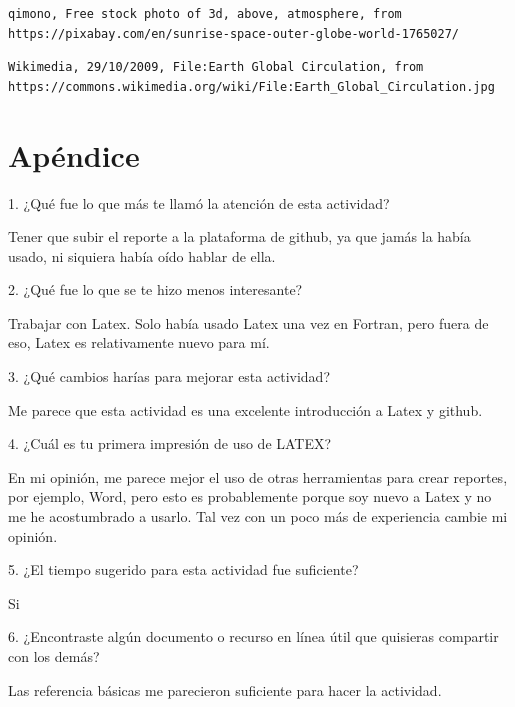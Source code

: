 \documentclass{article}
\begin{document}
\begin{verbatim}
qimono, Free stock photo of 3d, above, atmosphere, from
https://pixabay.com/en/sunrise-space-outer-globe-world-1765027/
\end{verbatim}

\begin{verbatim}
Wikimedia, 29/10/2009, File:Earth Global Circulation, from
https://commons.wikimedia.org/wiki/File:Earth_Global_Circulation.jpg
\end{verbatim}

\vspace{0.2cm}

\section{Apéndice}

1.	¿Qué fue lo que más te llamó la atención de esta actividad?

Tener que subir el reporte a la plataforma de github, ya que jamás la había usado, ni siquiera había oído hablar de ella.

\vspace{0.3cm}


2.	¿Qué fue lo que se te hizo menos interesante?

Trabajar con Latex. Solo había usado Latex una vez en Fortran, pero fuera de eso, Latex es relativamente nuevo para mí.  

\vspace{0.3cm}


3.	¿Qué cambios harías para mejorar esta actividad?

Me parece que esta actividad es una excelente introducción a Latex y github.

\vspace{0.3cm}


4.	¿Cuál es tu primera impresión de uso de LATEX?

En mi opinión, me parece mejor el uso de otras herramientas para crear reportes, por ejemplo, Word, pero esto es probablemente porque soy nuevo a Latex y no me he acostumbrado a usarlo. Tal vez con un poco más de experiencia cambie mi opinión. 

\vspace{0.3cm}


5.	¿El tiempo sugerido para esta actividad fue suficiente? 

Si

\vspace{0.3cm}


6.	¿Encontraste algún documento o recurso en línea útil que quisieras compartir con los demás?

Las referencia básicas me parecieron suficiente para hacer la actividad. 
\end{document}

